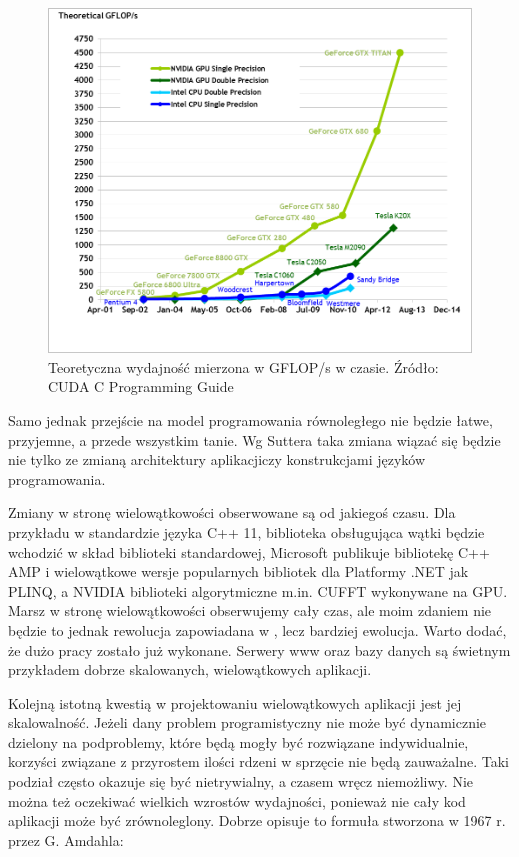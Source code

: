 \begin{figure}[ht]
\centering
\includegraphics[scale=0.4]{images/floating-point-operations-per-second.png}
\caption{Teoretyczna wydajność mierzona w GFLOP/s w czasie. Źródło: CUDA C Programming Guide}
\label{gflops}
\end{figure}

Samo jednak przejście na model programowania równoległego nie będzie łatwe,
przyjemne, a przede wszystkim tanie. Wg
Suttera taka zmiana wiązać się będzie nie tylko ze zmianą architektury
aplikacjiczy konstrukcjami języków programowania. 

Zmiany w stronę wielowątkowości obserwowane są od jakiegoś czasu. Dla przykładu
w 
standardzie języka C++ 11, biblioteka obsługująca wątki będzie wchodzić w skład
biblioteki standardowej, Microsoft publikuje bibliotekę C++ AMP i wielowątkowe
wersje popularnych bibliotek dla Platformy .NET jak PLINQ, a NVIDIA biblioteki
algorytmiczne m.in. CUFFT wykonywane na GPU. Marsz w stronę wielowątkowości
obserwujemy cały czas, ale moim zdaniem nie będzie to jednak rewolucja
zapowiadana w \cite{rewolucja}, lecz bardziej ewolucja. Warto dodać, że dużo
pracy zostało już wykonane.  Serwery www oraz bazy danych są świetnym przykładem
dobrze skalowanych, wielowątkowych aplikacji.

Kolejną istotną kwestią w projektowaniu wielowątkowych aplikacji jest jej
skalowalność. Jeżeli dany problem programistyczny nie może być
dynamicznie dzielony na podproblemy, które będą mogły być rozwiązane
indywidualnie, korzyści związane z przyrostem ilości rdzeni w sprzęcie nie będą
zauważalne. Taki podział często okazuje się być nietrywialny, a czasem
wręcz niemożliwy. Nie można też oczekiwać wielkich wzrostów wydajności, ponieważ nie
cały kod aplikacji może być zrównoleglony. Dobrze opisuje to formuła stworzona w
1967 r. przez G. Amdahla:

